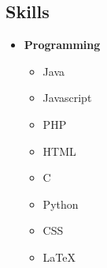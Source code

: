 \documentclass[11pt,letterpaper]{moderncv}
\begin{document}
\subsection{Skills}


\begin{itemize}

\item[]{\textbf{Programming}

	\vspace{-12pt}
	\begin{multicols}{4}
		\begin{itemize}[noitemsep, topsep=0pt]
			\item[] Java
			\item[] Javascript
			\item[] PHP
			\item[] HTML
			\item[] C
			\item[] Python
			\item[] CSS
			\item[] \LaTeX
		\end{itemize}
	\end{multicols}

}


\end{itemize}
\end{document}
